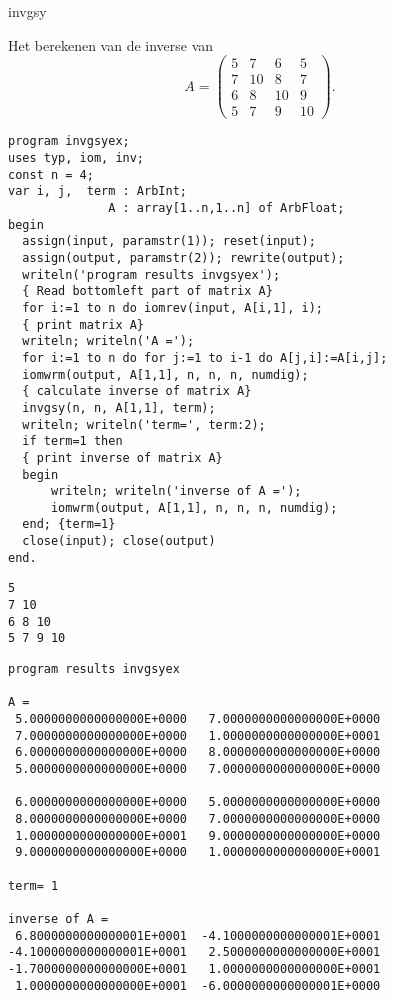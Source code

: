 \documentclass{report}
\newcommand{\Example}{\item[Example]\rmfamily}
\newcommand{\ProgramData}{\item[Example Data]\rmfamily}
\newcommand{\ProgramResults}{\item[Example Result]\rmfamily}
\begin{document}
\begin{procedure}{invgsy}
\Example

  Het berekenen van de inverse van
\[
 A=
 \left(
 \begin{array}{rrrr}
   5 & 7 & 6 & 5  \\
   7 & 10 & 8 & 7 \\
   6 & 8 & 10 & 9 \\
   5 & 7 & 9 & 10
 \end{array}
 \right)
 .
\]

\begin{lstlisting}
program invgsyex;
uses typ, iom, inv;
const n = 4;
var i, j,  term : ArbInt;
              A : array[1..n,1..n] of ArbFloat;
begin
  assign(input, paramstr(1)); reset(input);
  assign(output, paramstr(2)); rewrite(output);
  writeln('program results invgsyex');
  { Read bottomleft part of matrix A}
  for i:=1 to n do iomrev(input, A[i,1], i);
  { print matrix A}
  writeln; writeln('A =');
  for i:=1 to n do for j:=1 to i-1 do A[j,i]:=A[i,j];
  iomwrm(output, A[1,1], n, n, n, numdig);
  { calculate inverse of matrix A}
  invgsy(n, n, A[1,1], term);
  writeln; writeln('term=', term:2);
  if term=1 then
  { print inverse of matrix A}
  begin
      writeln; writeln('inverse of A =');
      iomwrm(output, A[1,1], n, n, n, numdig);
  end; {term=1}
  close(input); close(output)
end.
\end{lstlisting}

\ProgramData

\begin{verbatim}
5
7 10
6 8 10
5 7 9 10
\end{verbatim}

\ProgramResults

\begin{verbatim}
program results invgsyex

A =
 5.0000000000000000E+0000   7.0000000000000000E+0000
 7.0000000000000000E+0000   1.0000000000000000E+0001
 6.0000000000000000E+0000   8.0000000000000000E+0000
 5.0000000000000000E+0000   7.0000000000000000E+0000

 6.0000000000000000E+0000   5.0000000000000000E+0000
 8.0000000000000000E+0000   7.0000000000000000E+0000
 1.0000000000000000E+0001   9.0000000000000000E+0000
 9.0000000000000000E+0000   1.0000000000000000E+0001

term= 1

inverse of A =
 6.8000000000000001E+0001  -4.1000000000000001E+0001
-4.1000000000000001E+0001   2.5000000000000000E+0001
-1.7000000000000000E+0001   1.0000000000000000E+0001
 1.0000000000000000E+0001  -6.0000000000000001E+0000


\end{verbatim}
\end{procedure}
\end{document}
